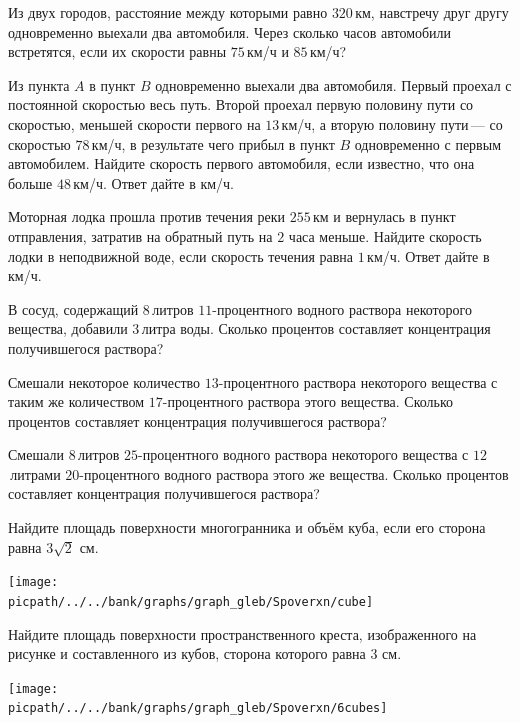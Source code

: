 \begin{homework}[number=4]
	\begin{listofex}
		\item Из двух городов, расстояние между которыми равно \(320\) км, навстречу друг другу одновременно выехали два автомобиля. Через сколько часов автомобили встретятся, если их скорости равны \(75\) км/ч и \(85\) км/ч?
		\item Из пункта \(A\) в пункт \(B\) одновременно выехали два автомобиля. Первый проехал с постоянной скоростью весь путь. Второй проехал первую половину пути со скоростью, меньшей скорости первого на \(13\) км/ч, а вторую половину пути --- со скоростью \(78\) км/ч, в результате чего прибыл в пункт \(B\) одновременно с первым автомобилем. Найдите скорость первого автомобиля, если известно, что она больше \(48\) км/ч. Ответ дайте в км/ч.
		\item Моторная лодка прошла против течения реки \(255\) км и вернулась в пункт отправления, затратив на обратный путь на \(2\) часа меньше. Найдите скорость лодки в неподвижной воде, если скорость течения равна \(1\) км/ч. Ответ дайте в км/ч.
		\item В сосуд, содержащий \(8\) литров \(11\)-процентного водного раствора некоторого вещества, добавили \(3\) литра воды. Сколько процентов составляет концентрация получившегося раствора?
		\item Смешали некоторое количество \(13\)-процентного раствора некоторого вещества с таким же количеством \(17\)-процентного раствора этого вещества. Сколько процентов составляет концентрация получившегося раствора?
		\item Смешали \(8\) литров \(25\)-процентного водного раствора некоторого вещества с \(12\) литрами \(20\)-процентного водного раствора этого же вещества. Сколько процентов составляет концентрация получившегося раствора?
		\item 
		\begin{minipage}[t]{\bodywidth}
			Найдите площадь поверхности многогранника и объём куба, если его сторона равна \(3\sqrt{2}\) см.
		\end{minipage}
		\hspace{0.02\linewidth}
		\begin{minipage}[t]{\picwidth}
			\texttt{[image: \\picpath/../../bank/graphs/graph\_gleb/Spoverxn/cube]}
		\end{minipage}
		\item 
		\begin{minipage}[t]{\bodywidth}
			Найдите площадь поверхности пространственного креста, изображенного на рисунке и составленного из кубов, сторона которого равна \(3\) см.
		\end{minipage}
		\hspace{0.02\linewidth}
		\begin{minipage}[t]{\picwidth}
			\texttt{[image: \\picpath/../../bank/graphs/graph\_gleb/Spoverxn/6cubes]}
		\end{minipage}
		

\end{listofex}
\end{homework}
